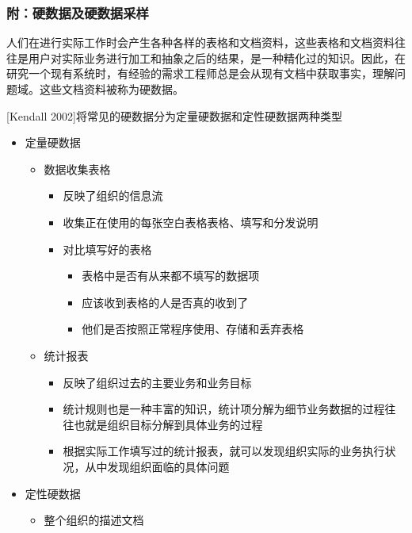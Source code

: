 \vspace{-0.5em}
\begin{shaded}

\subsubsection*{附：硬数据及硬数据采样}

人们在进行实际工作时会产生各种各样的表格和文档资料，这些表格和文档资料往往是用户对实际业务进行加工和抽象之后的结果，是一种精化过的知识。因此，在研究一个现有系统时，有经验的需求工程师总是会从现有文档中获取事实，理解问题域。这些文档资料被称为硬数据。

[Kendall 2002]将常见的硬数据分为定量硬数据和定性硬数据两种类型
\begin{itemize}
    \item 定量硬数据
    \begin{itemize}
        \item 数据收集表格
        \begin{itemize}
            \item 反映了组织的信息流 
            \item 收集正在使用的每张空白表格表格、填写和分发说明 
            \item 对比填写好的表格
            \begin{itemize}
                \item 表格中是否有从来都不填写的数据项
                \item 应该收到表格的人是否真的收到了
                \item 他们是否按照正常程序使用、存储和丢弃表格
            \end{itemize}
        \end{itemize}
        \item 统计报表
        \begin{itemize}
            \item 反映了组织过去的主要业务和业务目标
            \item 统计规则也是一种丰富的知识，统计项分解为细节业务数据的过程往往也就是组织目标分解到具体业务的过程
            \item 根据实际工作填写过的统计报表，就可以发现组织实际的业务执行状况，从中发现组织面临的具体问题  
        \end{itemize}
    \end{itemize}
    \item 定性硬数据
    \begin{itemize}
        \item 整个组织的描述文档 

\end{itemize}
\end{itemize}
\end{shaded}
